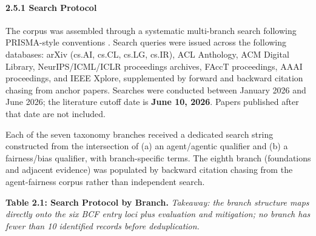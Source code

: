 \documentclass[10pt]{article}
\begin{document}
\paragraph*{2.5.1 Search Protocol}

The corpus was assembled through a systematic multi-branch search following PRISMA-style conventions \cite{moher2009preferred}. Search queries were issued across the following databases: arXiv (cs.AI, cs.CL, cs.LG, cs.IR), ACL Anthology, ACM Digital Library, NeurIPS/ICML/ICLR proceedings archives, FAccT proceedings, AAAI proceedings, and IEEE Xplore, supplemented by forward and backward citation chasing from anchor papers. Searches were conducted between January 2026 and June 2026; the literature cutoff date is \textbf{June 10, 2026}. Papers published after that date are not included.

Each of the seven taxonomy branches received a dedicated search string constructed from the intersection of (a) an agent/agentic qualifier and (b) a fairness/bias qualifier, with branch-specific terms. The eighth branch (foundations and adjacent evidence) was populated by backward citation chasing from the agent-fairness corpus rather than independent search.

\textbf{Table 2.1: Search Protocol by Branch.} \emph{Takeaway: the branch structure maps directly onto the six BCF entry loci plus evaluation and mitigation; no branch has fewer than 10 identified records before deduplication.}
\end{document}
